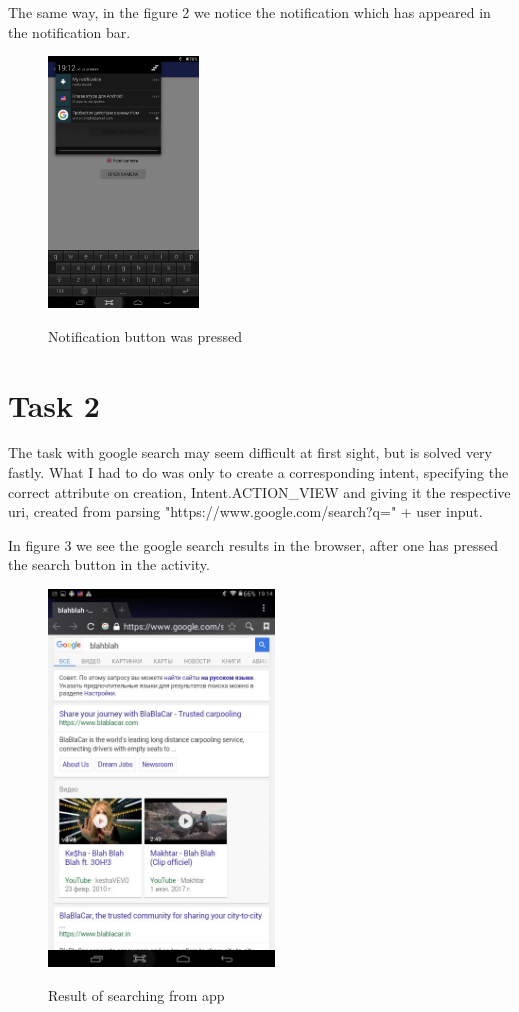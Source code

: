 \documentclass[12pt]{article}
\begin{document}
        The same way, in the figure 2 we notice the notification which has appeared in the notification bar.

        \begin{figure}[h]
        \centering
        \includegraphics[width=4cm]{s3.jpg}
        \label{fig:s2}
        \caption{Notification button was pressed}
        \end{figure}

    \newpage

    \section*{Task 2}
        The task with google search may seem difficult at first sight, but is solved very fastly. What I had to do was only to create a corresponding intent, specifying the correct attribute on creation, Intent.ACTION\_VIEW and giving it the respective uri, created from parsing "https://www.google.com/search?q=" + user input. 

        In figure 3 we see the google search results in the browser, after one has pressed the search button in the activity.

        \begin{figure}[h]
        \centering
        \includegraphics[width=6cm]{s4.jpg}
        \label{fig:s3}
        \caption{Result of searching from app}
        \end{figure}
\end{document}
